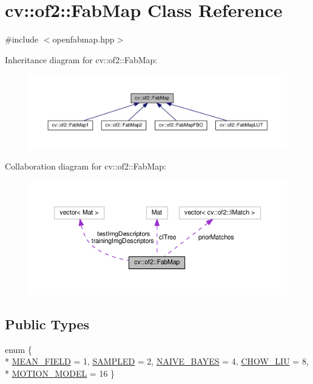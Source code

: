 \hypertarget{classcv_1_1of2_1_1FabMap}{\section{cv\-:\-:of2\-:\-:Fab\-Map Class Reference}
\label{classcv_1_1of2_1_1FabMap}
}


{\ttfamily \#include $<$openfabmap.\-hpp$>$}



Inheritance diagram for cv\-:\-:of2\-:\-:Fab\-Map\-:\nopagebreak
\begin{figure}[H]
\begin{center}
\leavevmode
\includegraphics[width=350pt]{classcv_1_1of2_1_1FabMap__inherit__graph}
\end{center}
\end{figure}


Collaboration diagram for cv\-:\-:of2\-:\-:Fab\-Map\-:\nopagebreak
\begin{figure}[H]
\begin{center}
\leavevmode
\includegraphics[width=350pt]{classcv_1_1of2_1_1FabMap__coll__graph}
\end{center}
\end{figure}
\subsection*{Public Types}
\begin{DoxyCompactItemize}
\item 
enum \{ \\*
\hyperlink{classcv_1_1of2_1_1FabMap_a843cc3739cda5d9154a3e2a3065e2036a64c5971672631f4b886c04ee6c93e2e1}{M\-E\-A\-N\-\_\-\-F\-I\-E\-L\-D} = 1, 
\hyperlink{classcv_1_1of2_1_1FabMap_a843cc3739cda5d9154a3e2a3065e2036a7674fb3142664d7fc0fca2d5bba5d559}{S\-A\-M\-P\-L\-E\-D} = 2, 
\hyperlink{classcv_1_1of2_1_1FabMap_a843cc3739cda5d9154a3e2a3065e2036aa66ae527b8e2b62f82ec2ec991f7c6f5}{N\-A\-I\-V\-E\-\_\-\-B\-A\-Y\-E\-S} = 4, 
\hyperlink{classcv_1_1of2_1_1FabMap_a843cc3739cda5d9154a3e2a3065e2036ade81aba98d2068c55b256572641d0c38}{C\-H\-O\-W\-\_\-\-L\-I\-U} = 8, 
\\*
\hyperlink{classcv_1_1of2_1_1FabMap_a843cc3739cda5d9154a3e2a3065e2036a908017fabb1fca82ec69654033ee46c8}{M\-O\-T\-I\-O\-N\-\_\-\-M\-O\-D\-E\-L} = 16
 \}
\end{DoxyCompactItemize}
